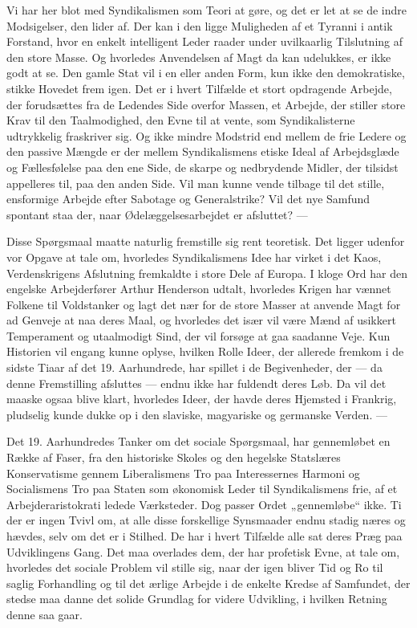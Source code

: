 \documentclass[12pt,a4paper,openany]{book}
\newcommand{\opage}[1]{\marginnote{\footnotesize\textit{[#1]}}}
\begin{document}
Vi har her blot med Syndikalismen som Teori at gøre, og det er
let at se de indre Modsigelser, den lider af. Der kan i den ligge Muligheden
af et Tyranni i antik Forstand, hvor en enkelt intelligent
Leder raader under uvilkaarlig Tilslutning af den store Masse. Og
hvorledes Anvendelsen af Magt da kan udelukkes, er ikke godt at
se. Den gamle Stat vil i en eller anden Form, kun ikke den demokratiske,
stikke Hovedet frem igen. Det er i hvert Tilfælde et stort
opdragende Arbejde, der forudsættes fra de Ledendes Side overfor
Massen, et Arbejde, der stiller store Krav til den Taalmodighed, den
Evne til at vente, som Syndikalisterne udtrykkelig fraskriver sig. Og
ikke mindre Modstrid end mellem de frie Ledere og den passive
Mængde er der mellem Syndikalismens etiske Ideal af Arbejdsglæde
og Fællesfølelse paa den ene Side, de skarpe og nedbrydende Midler,
der tilsidst appelleres til, paa den anden Side. Vil man kunne vende
tilbage til det stille, ensformige Arbejde efter Sabotage og Generalstrike?
Vil det nye Samfund spontant staa der, naar Ødelæggelsesarbejdet
er afsluttet? ---

Disse Spørgsmaal maatte naturlig fremstille sig rent teoretisk. Det
ligger udenfor vor Opgave at tale om, hvorledes Syndikalismens
Idee har virket i det Kaos, Verdenskrigens Afslutning fremkaldte i
store Dele af Europa. I kloge Ord har den engelske Arbejderfører
Arthur Henderson udtalt, hvorledes Krigen har vænnet Folkene til
Voldstanker og lagt det nær for de store Masser at anvende Magt
\opage{101}for ad Genveje at naa deres Maal, og hvorledes det især vil være
Mænd af usikkert Temperament og utaalmodigt Sind, der vil forsøge
at gaa saadanne Veje. Kun Historien vil engang kunne oplyse, hvilken
Rolle Ideer, der allerede fremkom i de sidste Tiaar af det 19.
Aarhundrede, har spillet i de Begivenheder, der --- da denne Fremstilling
afsluttes --- endnu ikke har fuldendt deres Løb. Da vil det
maaske ogsaa blive klart, hvorledes Ideer, der havde deres Hjemsted
i Frankrig, pludselig kunde dukke op i den slaviske, magyariske og
germanske Verden. ---

Det 19. Aarhundredes Tanker om det sociale Spørgsmaal, har gennemløbet
en Række af Faser, fra den historiske Skoles og den hegelske
Statslæres Konservatisme gennem Liberalismens Tro paa Interessernes
Harmoni og Socialismens Tro paa Staten som økonomisk
Leder til Syndikalismens frie, af et Arbejderaristokrati ledede Værksteder.
Dog passer Ordet „gennemløbe“ ikke. Ti der er ingen Tvivl
om, at alle disse forskellige Synsmaader endnu stadig næres og
hævdes, selv om det er i Stilhed. De har i hvert Tilfælde alle sat
deres Præg paa Udviklingens Gang. Det maa overlades dem, der har
profetisk Evne, at tale om, hvorledes det sociale Problem vil stille
sig, naar der igen bliver Tid og Ro til saglig Forhandling og til det
ærlige Arbejde i de enkelte Kredse af Samfundet, der stedse maa
danne det solide Grundlag for videre Udvikling, i hvilken Retning
denne saa gaar.
\end{document}
